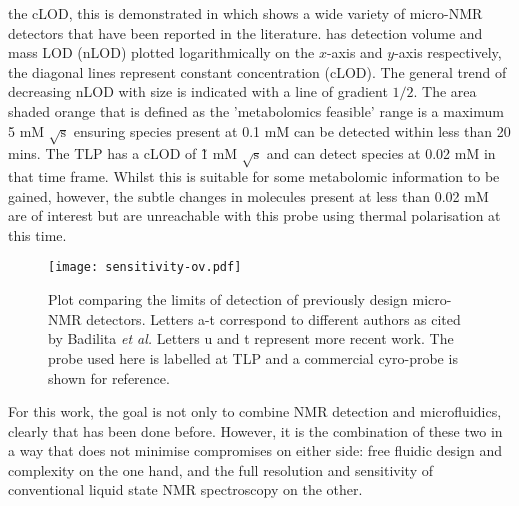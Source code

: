 the cLOD, this is demonstrated in  which shows a wide variety of micro-NMR detectors that have been reported in the literature.
 has detection volume and mass LOD (nLOD) plotted logarithmically
on the $x$-axis and $y$-axis respectively, the diagonal lines represent constant concentration (cLOD).
The general trend of decreasing nLOD with size is indicated with a line of gradient $1/2$. The area shaded orange that
is defined as the 'metabolomics feasible' range is a maximum 5 mM $\sqrt{\text{s}}$
ensuring species present at 0.1 mM can be detected within less than 20 mins. The TLP has a cLOD of \~1 mM $\sqrt{\text{s}}$ and can detect
species at 0.02 mM in that time frame. Whilst this is suitable for some metabolomic information to be
gained, however, the subtle changes in molecules present at less than 0.02 mM are of interest but
are unreachable with this probe using thermal polarisation at this time.
\begin{figure}
  \texttt{[image: sensitivity-ov.pdf]}
  \caption{Plot comparing the limits of detection of previously design micro-NMR detectors. Letters
  a-t correspond to different authors as cited by Badilita \textit{et al.} \citep{Badilita:2011td} Letters u \citep{Meier:2014ds}
  and t \citep{RN165} represent more recent work. The probe used here is labelled at TLP and a commercial cyro-probe is shown for reference.}
  \label{fig:cLOD}
\end{figure}

For this work, the goal is not only to combine NMR detection and microfluidics, clearly that has been done before. However,
it is the combination of these two in a way that does not minimise compromises on either side: free fluidic design and complexity
on the one hand, and the full resolution and sensitivity of conventional liquid state NMR spectroscopy on the other.
